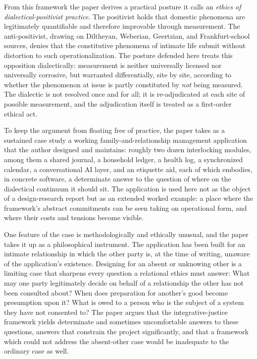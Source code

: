 \documentclass[11pt,a4paper]{article}
\begin{document}
From this framework the paper derives a practical posture it calls an \emph{ethics of dialectical-positivist practice}. The positivist holds that domestic phenomena are legitimately quantifiable and therefore improvable through measurement. The anti-positivist, drawing on Diltheyan, Weberian, Geertzian, and Frankfurt-school sources, denies that the constitutive phenomena of intimate life submit without distortion to such operationalization. The posture defended here treats this opposition dialectically: measurement is neither universally licensed nor universally corrosive, but warranted differentially, site by site, according to whether the phenomenon at issue is partly constituted by \emph{not} being measured. The dialectic is not resolved once and for all; it is re-adjudicated at each site of possible measurement, and the adjudication itself is treated as a first-order ethical act.

To keep the argument from floating free of practice, the paper takes as a sustained case study a working family-and-relationship management application that the author designed and maintains: roughly two dozen interlocking modules, among them a shared journal, a household ledger, a health log, a synchronized calendar, a conversational AI layer, and an etiquette aid, each of which embodies, in concrete software, a determinate answer to the question of where on the dialectical continuum it should sit. The application is used here not as the object of a design-research report but as an extended worked example: a place where the framework's abstract commitments can be seen taking on operational form, and where their costs and tensions become visible.

One feature of the case is methodologically and ethically unusual, and the paper takes it up as a philosophical instrument. The application has been built for an intimate relationship in which the other party is, at the time of writing, unaware of the application's existence. Designing for an absent or unknowing other is a limiting case that sharpens every question a relational ethics must answer: What may one party legitimately decide on behalf of a relationship the other has not been consulted about? When does preparation for another's good become presumption upon it? What is owed to a person who is the subject of a system they have not consented to? The paper argues that the integrative-justice framework yields determinate and sometimes uncomfortable answers to these questions, answers that constrain the project significantly, and that a framework which could not address the absent-other case would be inadequate to the ordinary case as well.
\end{document}
